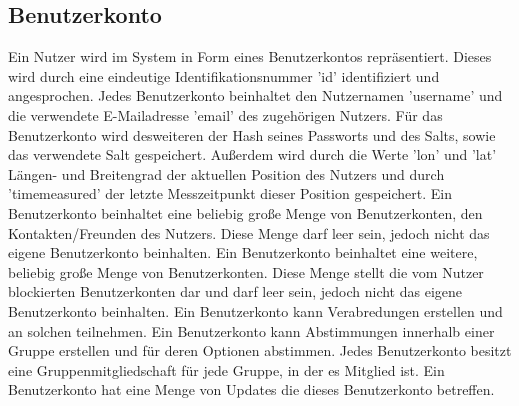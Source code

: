 \documentclass[parskip=full,11pt]{scrartcl}
\begin{document}
\subsection{Benutzerkonto}
Ein Nutzer wird im System in Form eines Benutzerkontos repräsentiert.
Dieses wird durch eine eindeutige Identifikationsnummer 'id' identifiziert und
angesprochen. Jedes Benutzerkonto beinhaltet den Nutzernamen 'username' und
die verwendete E-Mailadresse 'email' des zugehörigen Nutzers.
Für das Benutzerkonto wird desweiteren der Hash seines Passworts und des Salts,
sowie das verwendete Salt gespeichert.
Außerdem wird durch die Werte 'lon' und 'lat' Längen- und Breitengrad der
aktuellen Position des Nutzers und durch 'timemeasured' der letzte
Messzeitpunkt dieser Position gespeichert.
Ein Benutzerkonto beinhaltet eine beliebig große Menge von Benutzerkonten,
den Kontakten/Freunden des Nutzers. Diese Menge darf leer sein, jedoch nicht
das eigene Benutzerkonto beinhalten.
Ein Benutzerkonto beinhaltet eine weitere,
beliebig große Menge von Benutzerkonten.
Diese Menge stellt die vom Nutzer blockierten Benutzerkonten dar und darf leer
sein, jedoch nicht das eigene Benutzerkonto beinhalten. Ein Benutzerkonto kann
Verabredungen erstellen und an solchen teilnehmen.
Ein Benutzerkonto kann Abstimmungen innerhalb einer Gruppe erstellen und für
deren Optionen abstimmen.
Jedes Benutzerkonto besitzt eine Gruppenmitgliedschaft für jede Gruppe, in der
es Mitglied ist.
Ein Benutzerkonto hat eine Menge von Updates die dieses Benutzerkonto
betreffen.

\pagebreak
\end{document}
